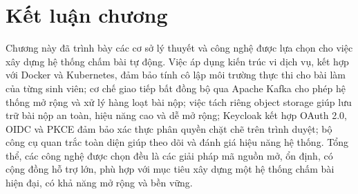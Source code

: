 \documentclass[../BTL.tex]{subfiles}
\begin{document}
\section{Kết luận chương}
\label{section:2.11}

Chương này đã trình bày các cơ sở lý thuyết và công nghệ được lựa chọn cho việc xây dựng hệ thống chấm bài tự động. Việc áp dụng kiến trúc vi dịch vụ, kết hợp với Docker và Kubernetes, đảm bảo tính cô lập môi trường thực thi cho bài làm của từng sinh viên; cơ chế giao tiếp bất đồng bộ qua Apache Kafka cho phép hệ thống mở rộng và xử lý hàng loạt bài nộp; việc tách riêng object storage giúp lưu trữ bài nộp an toàn, hiệu năng cao và dễ mở rộng; Keycloak kết hợp OAuth 2.0, OIDC và PKCE đảm bảo xác thực phân quyền chặt chẽ trên trình duyệt; bộ công cụ quan trắc toàn diện giúp theo dõi và đánh giá hiệu năng hệ thống. Tổng thể, các công nghệ được chọn đều là các giải pháp mã nguồn mở, ổn định, có cộng đồng hỗ trợ lớn, phù hợp với mục tiêu xây dựng một hệ thống chấm bài hiện đại, có khả năng mở rộng và bền vững.
\end{document}
